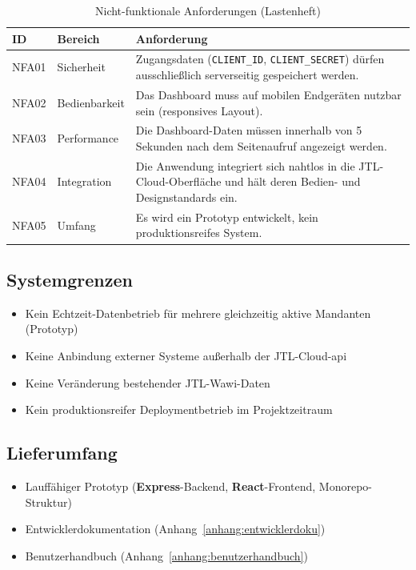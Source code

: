 \documentclass[11pt, a4paper, oneside]{report}
\begin{document}
\begin{table}[H]
  \centering
  \caption{Nicht-funktionale Anforderungen (Lastenheft)}
  \label{tab:lastenheft_nfa}
  \begin{tabularx}{\textwidth}{l l X}
    \toprule
    \textbf{ID} & \textbf{Bereich} & \textbf{Anforderung} \\
    \midrule
    NFA01 & Sicherheit  & Zugangsdaten (\texttt{CLIENT\_ID}, \texttt{CLIENT\_SECRET})
                          dürfen ausschließlich serverseitig gespeichert werden. \\
    NFA02 & Bedienbarkeit & Das Dashboard muss auf mobilen Endgeräten nutzbar sein
                            (responsives Layout). \\
    NFA03 & Performance  & Die Dashboard-Daten müssen innerhalb von 5 Sekunden nach
                            dem Seitenaufruf angezeigt werden. \\
    NFA04 & Integration  & Die Anwendung integriert sich nahtlos in die
                           JTL-Cloud-Oberfläche und hält deren Bedien- und
                           Designstandards ein. \\
    NFA05 & Umfang       & Es wird ein Prototyp entwickelt, kein
                           produktionsreifes System. \\
    \bottomrule
  \end{tabularx}
\end{table}

\subsection*{Systemgrenzen}

\begin{itemize}[leftmargin=1.5em]
  \item Kein Echtzeit-Datenbetrieb für mehrere gleichzeitig aktive Mandanten (Prototyp)
  \item Keine Anbindung externer Systeme außerhalb der JTL-Cloud-\gls{api}
  \item Keine Veränderung bestehender JTL-Wawi-Daten
  \item Kein produktionsreifer Deploymentbetrieb im Projektzeitraum
\end{itemize}

\subsection*{Lieferumfang}

\begin{itemize}[leftmargin=1.5em]
  \item Lauffähiger Prototyp (\textbf{Express}-Backend, \textbf{React}-Frontend, Monorepo-Struktur)
  \item Entwicklerdokumentation (Anhang~\ref{anhang:entwicklerdoku})
  \item Benutzerhandbuch (Anhang~\ref{anhang:benutzerhandbuch})
\end{itemize}
\end{document}
